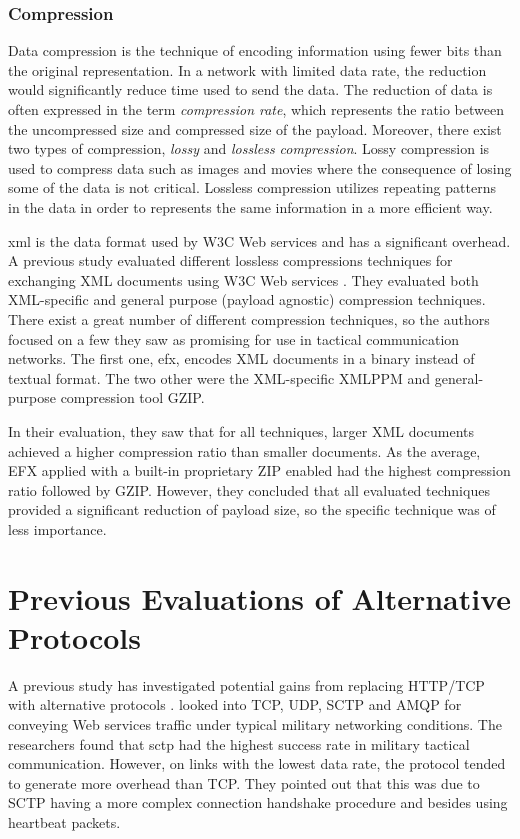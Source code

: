 \subsubsection{Compression}

Data compression is the technique of encoding information using fewer bits than
the original representation. In a network with limited data rate, the reduction
would significantly reduce time used to send the data. The reduction of data is
often expressed in the term \textit{compression rate}, which represents the
ratio between the uncompressed size and compressed size of the payload.
Moreover, there exist two types of compression, \textit{lossy} and
\textit{lossless compression}. Lossy compression is used to compress data such
as images and movies where the consequence of losing some of the data is not
critical. Lossless compression utilizes repeating patterns in the data in order
to represents the same information in a more efficient way.

\gls{xml} is the data format used by W3C Web services and has a significant
overhead. A previous study evaluated different lossless compressions techniques
for exchanging XML documents using W3C Web services \cite{johnsen-compression}.
They evaluated both XML-specific and general purpose (payload agnostic)
compression techniques. There exist a great number of different compression
techniques, so the authors focused on a few they saw as promising for use in
tactical communication networks. The first one, \gls{efx}, encodes XML documents
in a binary instead of textual format. The two other were the XML-specific XMLPPM
and general-purpose compression tool GZIP.

In their evaluation, they saw that for all techniques, larger XML documents
achieved a higher compression ratio than smaller documents. As the average, EFX
applied with a built-in proprietary ZIP enabled had the highest compression
ratio followed by GZIP. However, they concluded that all evaluated techniques
provided a significant reduction of payload size, so the specific technique was
of less importance.


\section{Previous Evaluations of Alternative Protocols}

A previous study has investigated potential gains from replacing HTTP/TCP with
alternative protocols \cite{evaluation-transport-protocols-web-services}.
 looked into TCP, UDP,
SCTP and AMQP for conveying Web services traffic under typical military
networking conditions. The researchers found that \gls{sctp} had the highest
success rate in military tactical communication. However, on links with the
lowest data rate, the protocol tended to generate more overhead than TCP. They
pointed out that this was due to SCTP having a more complex connection handshake
procedure and besides using heartbeat packets.

